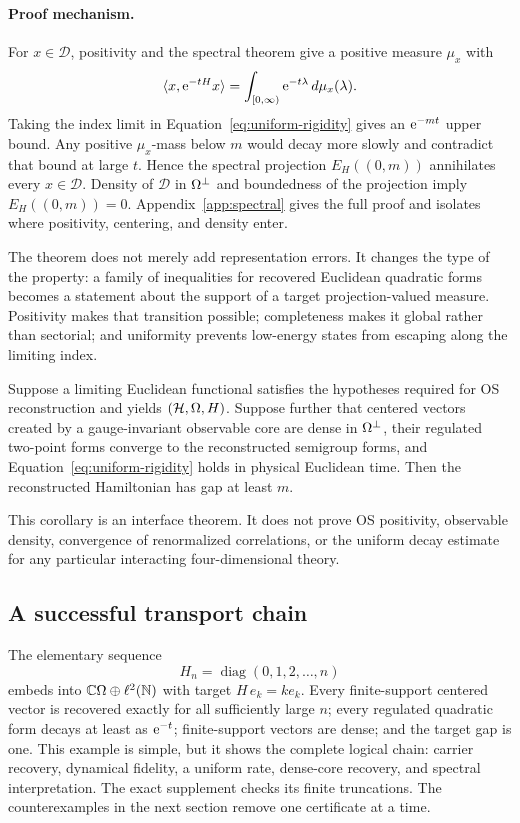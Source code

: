 \paragraph{Proof mechanism.}
For $x\in\mathcal D$, positivity and the spectral theorem give a positive
measure $\mu_x$ with
\[
 \langle x,\mathrm e^{-tH}x\rangle
   =\int_{[0,\infty)}\mathrm e^{-t\lambda}\,d\mu_x(\lambda).
\]
Taking the index limit in Equation~\eqref{eq:uniform-rigidity} gives an
$\mathrm e^{-mt}$ upper bound.  Any positive $\mu_x$-mass below $m$ would decay more
slowly and contradict that bound at large $t$.  Hence the spectral projection
$E_H((0,m))$ annihilates every $x\in\mathcal D$.  Density of $\mathcal D$ in
$\Omega^\perp$ and boundedness of the projection imply
$E_H((0,m))=0$.  Appendix~\ref{app:spectral} gives the full proof and isolates
where positivity, centering, and density enter.

The theorem does not merely add representation errors.  It changes the type
of the property: a family of inequalities for recovered Euclidean quadratic
forms becomes a statement about the support of a target projection-valued
measure.  Positivity makes that transition possible; completeness makes it
global rather than sectorial; and uniformity prevents low-energy states from
escaping along the limiting index.

\begin{corollary}
\label{cor:os}
Suppose a limiting Euclidean functional satisfies the hypotheses required for
OS reconstruction and yields $(\mathcal H,\Omega,H)$.  Suppose further that centered
vectors created by a gauge-invariant observable core are dense in
$\Omega^\perp$, their regulated two-point forms converge to the reconstructed
semigroup forms, and Equation~\eqref{eq:uniform-rigidity} holds in physical
Euclidean time.  Then the reconstructed Hamiltonian has gap at least $m$.
\end{corollary}

This corollary is an interface theorem.  It does not prove OS positivity,
observable density, convergence of renormalized correlations, or the uniform
decay estimate for any particular interacting four-dimensional theory.

\subsection{A successful transport chain}

The elementary sequence
\[
 H_n=\operatorname{diag}(0,1,2,\ldots,n)
\]
embeds into $\mathbb C\Omega\oplus\ell^2(\mathbb N)$ with target
$H\,e_k=k e_k$.  Every finite-support centered vector is recovered exactly
for all sufficiently large $n$; every regulated quadratic form decays at
least as $\mathrm e^{-t}$; finite-support vectors are dense; and the target gap is
one.  This example is simple, but it shows the complete logical chain:
carrier recovery, dynamical fidelity, a uniform rate, dense-core recovery,
and spectral interpretation.  The exact supplement checks its finite
truncations.  The counterexamples in the next section remove one certificate
at a time.
